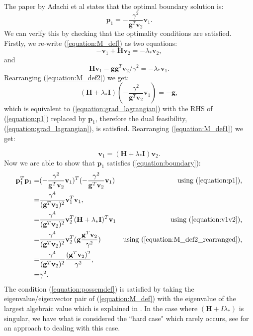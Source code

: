 \documentclass[letterpaper,12pt,titlepage,oneside,final]{book}
\begin{document}
	The paper by Adachi et al \cite{adachi.paper} states that the optimal boundary solution is:
	\begin{equation}
	\mathbf{p}_{1} = - \frac{\gamma^{2}}{\mathbf{g}^{T}\mathbf{v}_{2}}\mathbf{v}_{1}.
	\label{equation:p1}
	\end{equation}
	We can verify this by checking that the optimality conditions are satisfied. Firstly, we re-write (\ref{equation:M_def}) as two equations:
	\begin{equation}
	-\mathbf{v}_{1} + \mathbf{H}\mathbf{v}_{2} = -\lambda_{*}\mathbf{v}_{2},
	\label{equation:M_def1}
	\end{equation}
	and
	\begin{equation}
	\mathbf{H}\mathbf{v}_{1}-\mathbf{gg}^{T}\mathbf{v}_{2}/\gamma^{2} = -\lambda_{*}\mathbf{v}_{1}.
	\label{equation:M_def2}
	\end{equation}
	Rearranging (\ref{equation:M_def2}) we get:
	\begin{equation}
	(\mathbf{H} + \lambda_{*}\mathbf{I})(- \frac{\gamma^{2}}{\mathbf{g}^{T}\mathbf{v}_{2}}\mathbf{v}_{1}) = -\mathbf{g},
	\label{equation:M_def2_rearranged}
	\end{equation}
	which is equivalent to (\ref{equation:grad_lagrangian}) with the RHS of (\ref{equation:p1}) replaced by $\mathbf{p}_{1}$, therefore the dual feasibility, (\ref{equation:grad_lagrangian}), is satisfied. Rearranging (\ref{equation:M_def1}) we get:
	
	\begin{equation}
	\mathbf{v}_{1} = (\mathbf{H} + \lambda_{*}\mathbf{I})\mathbf{v}_{2}.
	\label{equation:v1v2}
	\end{equation}
	Now we are able to show that $\mathbf{p}_{1}$ satisfies (\ref{equation:boundary}):
	\begin{align*}
	\mathbf{p}_{1}^{T}\mathbf{p}_{1} =  & (- \frac{\gamma^{2}}{\mathbf{g}^{T}\mathbf{v}_{2}}\mathbf{v}_{1})^{T}(- \frac{\gamma^{2}}{\mathbf{g}^{T}\mathbf{v}_{2}}\mathbf{v}_{1}) & \text{using (\ref{equation:p1})},\\
	= & \frac{\gamma^{4}}{(\mathbf{g}^{T}\mathbf{v}_{2})^{2}}\mathbf{v}_{1}^{T}\mathbf{v}_{1}, \\
	= & \frac{\gamma^{4}}{(\mathbf{g}^{T}\mathbf{v}_{2})^{2}}\mathbf{v}_{2}^{T}(\mathbf{H} + \lambda_{*}\mathbf{I})^{T}\mathbf{v}_{1} & \text{using (\ref{equation:v1v2}),} \\ 
	= & \frac{\gamma^{4}}{(\mathbf{g}^{T}\mathbf{v}_{2})^{2}}\mathbf{v}_{2}^{T}(\mathbf{g}\frac{\mathbf{g}^{T}\mathbf{v}_{2}}{\gamma^{2}}) & \text{using (\ref{equation:M_def2_rearranged})},\\
	= & \frac{\gamma^{4}}{(\mathbf{g}^{T}\mathbf{v}_{2})^{2}}\frac{(\mathbf{g}^{T}\mathbf{v}_{2})^{2}}{\gamma^{2}}, \\
	= &\gamma^{2}.
	\end{align*}
	The condition (\ref{equation:possemdef}) is satisfied by taking the eigenvalue/eigenvector pair of (\ref{equation:M_def}) with the eigenvalue of the largest algebraic value which is explained in \cite{adachi.paper}. In the case where $(\mathbf{H} + I\lambda_{*})$ is singular, we have what is considered the ``hard case" which rarely occurs, see \cite{adachi.paper} for an approach to dealing with this case.  
	
\end{document}
